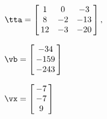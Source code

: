 {$\tta = \left[\hskip -3pt \begin{array}{ccc} 1&0&-3\\  8&-2&-13
\\  12&-3&-20\end{array}\hskip -3pt \right],$

$\vb = \left[\hskip -3pt \begin{array}{c} -34\\  -159
\\  -243\end{array}\hskip -3pt \right]$ 
}
{$\vx = \left[\hskip -3pt \begin{array}{c} -7\\  -7\\  
9\end{array}\hskip -3pt \right] $}
